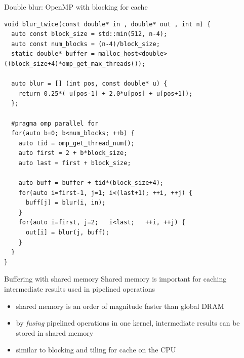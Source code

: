 \begin{frame}[fragile]{}
    \begin{code}{Double blur: OpenMP with blocking for cache}
        \begin{lstlisting}[style=boxcudatiny]
void blur_twice(const double* in , double* out , int n) {
  auto const block_size = std::min(512, n-4);
  auto const num_blocks = (n-4)/block_size;
  static double* buffer = malloc_host<double>((block_size+4)*omp_get_max_threads());

  auto blur = [] (int pos, const double* u) {
    return 0.25*( u[pos-1] + 2.0*u[pos] + u[pos+1]);
  };

  #pragma omp parallel for
  for(auto b=0; b<num_blocks; ++b) {
    auto tid = omp_get_thread_num();
    auto first = 2 + b*block_size;
    auto last = first + block_size;

    auto buff = buffer + tid*(block_size+4);
    for(auto i=first-1, j=1; i<(last+1); ++i, ++j) {
      buff[j] = blur(i, in);
    }
    for(auto i=first, j=2;   i<last;   ++i, ++j) {
      out[i] = blur(j, buff);
    }
  }
}
        \end{lstlisting}
    \end{code}
\end{frame}

\begin{frame}[fragile]{}
    \begin{info}{Buffering with shared memory}
        Shared memory is important for caching intermediate results used in pipelined operations
        \begin{itemize}
            \item shared memory is an order of magnitude faster than global DRAM
            \item by \emph{fusing} pipelined operations in one kernel, intermediate results can be stored in shared memory
            \item similar to blocking and tiling for cache on the CPU
        \end{itemize}
    \end{info}

\end{frame}


